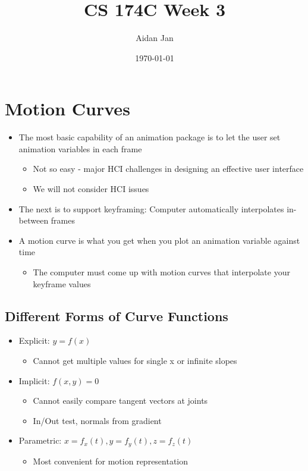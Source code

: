 \documentclass{article}
\title{CS 174C Week 3}
\author{Aidan Jan}
\date{\today}
\begin{document}
\maketitle
\section*{Motion Curves}
\begin{itemize}
    \item The most basic capability of an animation package is to let the user set animation variables in each frame
    \begin{itemize}
        \item Not so easy - major HCI challenges in designing an effective user interface
        \item We will not consider HCI issues
    \end{itemize}
    \item The next is to support keyframing: Computer automatically interpolates in-between frames
    \item A motion curve is what you get when you plot an animation variable against time
    \begin{itemize}
        \item The computer must come up with motion curves that interpolate your keyframe values
    \end{itemize}
\end{itemize}

\subsection*{Different Forms of Curve Functions}
\begin{itemize}
    \item Explicit: $y = f(x)$
    \begin{itemize}
        \item Cannot get multiple values for single x or infinite slopes
    \end{itemize}
    \item Implicit: $f(x, y) = 0$
    \begin{itemize}
        \item Cannot easily compare tangent vectors at joints
        \item In/Out test, normals from gradient
    \end{itemize}
    \item Parametric: $x = f_x(t), y = f_y(t), z = f_z(t)$
    \begin{itemize}
        \item Most convenient for motion representation
    \end{itemize}
\end{itemize}
\end{document}
